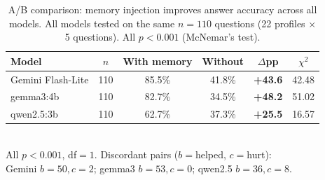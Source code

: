\begin{table}[ht]
\centering
\caption{A/B comparison: memory injection improves answer accuracy across all models. All models tested on the same $n{=}110$ questions (22 profiles $\times$ 5 questions). All $p < 0.001$ (McNemar's test).}
\label{tab:ab_results}
\begin{tabular}{lccccc}
\toprule
\textbf{Model} & \textbf{$n$} & \textbf{With memory} & \textbf{Without} & \textbf{$\Delta$pp} & \textbf{$\chi^2$} \\
\midrule
Gemini Flash-Lite & 110 & 85.5\% & 41.8\% & \textbf{+43.6} & 42.48 \\
gemma3:4b     & 110 & 82.7\% & 34.5\% & \textbf{+48.2} & 51.02 \\
qwen2.5:3b    & 110 & 62.7\% & 37.3\% & \textbf{+25.5} & 16.57 \\
\bottomrule
\end{tabular}
\\[4pt]
\footnotesize All $p < 0.001$, df$=1$. Discordant pairs ($b{=}$helped, $c{=}$hurt): \\
Gemini $b{=}50, c{=}2$; gemma3 $b{=}53, c{=}0$; qwen2.5 $b{=}36, c{=}8$.
\end{table}
